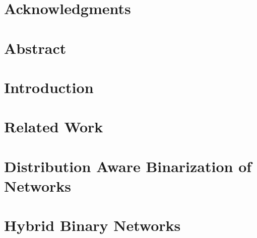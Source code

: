 \documentclass[11pt]{book}
\renewcommand{\baselinestretch}{1.2}
\begin{document}

\newpage
\thispagestyle{empty}
\renewcommand{\thesisdedication}{
    {\large Copyright \copyright~~Ameya Prabhu, 2019\\}
    {\large All Rights Reserved\\}
}
\thesisdedicationpage

\newpage
\thispagestyle{empty}
\renewcommand{\thesisdedication}{
    {\large To understanding colourless green CNNs which dream furiously}
}
\thesisdedicationpage
\mastersthesis
\renewcommand{\baselinestretch}{1.5}
\chapter*{Acknowledgments}
\label{ch:ack}

\chapter*{Abstract}
\label{ch:abstract}

\tableofcontents
\listoffigures
\listoftables
\chapter{Introduction}
\label{ch:intro}

\chapter{Related Work}
\label{ch:related}

\chapter{Distribution Aware Binarization of Networks}
\label{ch:dabn}

\chapter{Hybrid Binary Networks}
\label{ch:hbn}

\end{document}

